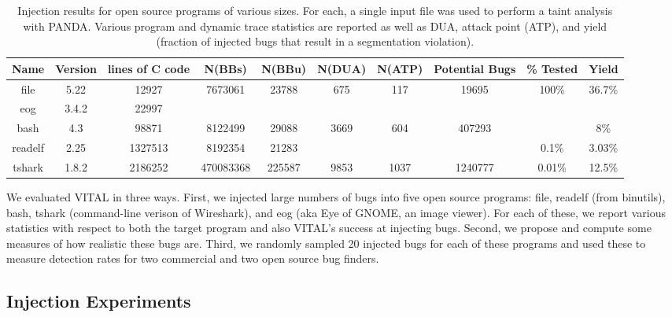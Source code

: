 
\label{section:results}

\begin{table}[t!]
\centering
\begin{tabular}{c|c|c|c|c|c|c|c|c|c} 
Name    & Version & lines of C code & N(BBs)     & N(BBu)   & N(DUA)  & N(ATP) & Potential Bugs & \% Tested & Yield \\\hline
file    & 5.22    & 12927           & 7673061    & 23788    & 675     & 117    & 19695          & 100\%     & 36.7\%  \\
eog     & 3.4.2   & 22997           &            &          &         &        &                &           & \\ 
bash    & 4.3     & 98871           & 8122499    & 29088    & 3669    & 604    & 407293         &           & 8\% \\
readelf & 2.25    & 1327513         & 8192354    & 21283    &     &     &          & 0.1\%                  & 3.03\% \\
tshark  & 1.8.2   & 2186252         & 470083368  & 225587   & 9853    & 1037   & 1240777        & 0.01\%    & 12.5\% \\
\end{tabular}
\caption{Injection results for open source programs of various sizes.
For each, a single input file was used to perform a taint analysis with PANDA.
Various program and dynamic trace statistics are reported as well as DUA, attack point (ATP), and yield (fraction of injected bugs that result in a segmentation violation).}
\label{table:insertion-results}
\end{table}

We evaluated VITAL in three ways.
First, we injected large numbers of bugs into five open source programs: file, readelf (from binutils), bash, tshark (command-line verison of Wireshark), and eog (aka Eye of GNOME, an image viewer).
For each of these, we report various statistics with respect to both the target program and also VITAL's success at injecting bugs.
Second, we propose and compute some measures of how realistic these bugs are.
Third, we randomly sampled 20 injected bugs for each of these programs and used these to measure detection rates for two commercial and two open source bug finders.

\subsection{Injection Experiments}

